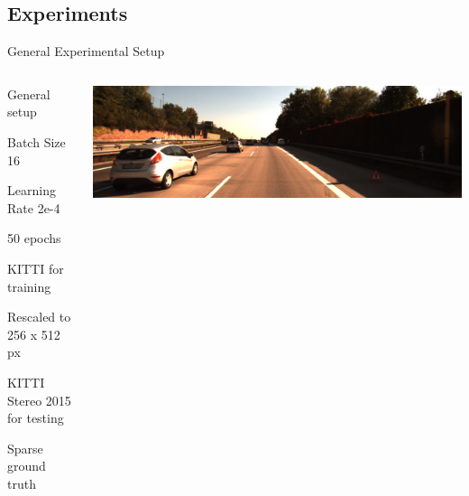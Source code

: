 \documentclass[11pt]{beamer}
\newenvironment{wideitemize}{\itemize\addtolength{\itemsep}{.75em}}{\enditemize}
\newcommand{\addsubitemspace}{\vspace{0.5em}}
\begin{document}
\subsection{Experiments}
\begin{frame}[c]{General Experimental Setup}
  
    \begin{columns}
        \begin{column}{0.5\textwidth}
           \begin{wideitemize}
            \item General setup
            \addsubitemspace
            \begin{wideitemize}
                \item Batch Size 16
                \item Learning Rate 2e-4
                \item 50 epochs
            \end{wideitemize}
            
            \item KITTI for training        
            \addsubitemspace
                \begin{wideitemize}
                    \item Rescaled to 256 x 512 px
                \end{wideitemize}
            \item KITTI Stereo 2015 for testing
            \addsubitemspace
                \begin{wideitemize}
                    \item Sparse ground truth
                \end{wideitemize}
            \end{wideitemize}
        \end{column}
        
        \begin{column}{0.5\textwidth}
            \centering
            \includegraphics[width=1.0\textwidth]{figures/kitti_example.jpg}
            

\end{column}
\end{columns}
\end{frame}
\end{document}
